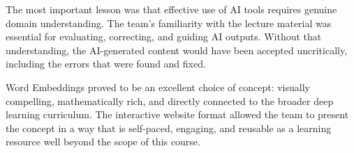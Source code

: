 The most important lesson was that effective use of AI tools requires genuine domain understanding. The team's familiarity with the lecture material was essential for evaluating, correcting, and guiding AI outputs. Without that understanding, the AI-generated content would have been accepted uncritically, including the errors that were found and fixed.

Word Embeddings proved to be an excellent choice of concept: visually compelling, mathematically rich, and directly connected to the broader deep learning curriculum. The interactive website format allowed the team to present the concept in a way that is self-paced, engaging, and reusable as a learning resource well beyond the scope of this course.
